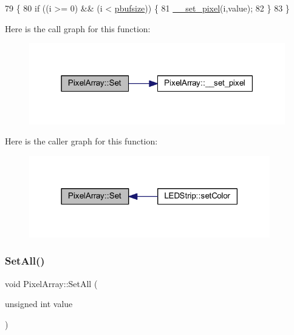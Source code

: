 \begin{DoxyCode}
79 \{
80     \textcolor{keywordflow}{if} ((i >= 0) && (i < \hyperlink{class_pixel_array_aca29e70f9b643bff3733ab2e694439a1}{pbufsize})) \{
81         \hyperlink{class_pixel_array_a4b1a6582bc3bab1f67aebd1f97a5595d}{\_\_set\_pixel}(i,value);
82     \}
83 \}
\end{DoxyCode}
Here is the call graph for this function\+:\nopagebreak
\begin{figure}[H]
\begin{center}
\leavevmode
\includegraphics[width=316pt]{class_pixel_array_afcfe32b74beeced27f928f42131d77c1_cgraph}
\end{center}
\end{figure}
Here is the caller graph for this function\+:\nopagebreak
\begin{figure}[H]
\begin{center}
\leavevmode
\includegraphics[width=297pt]{class_pixel_array_afcfe32b74beeced27f928f42131d77c1_icgraph}
\end{center}
\end{figure}
\mbox{\label{class_pixel_array_a5f560dcef3d1582614858969b20da89d}} 
\subsubsection{\texorpdfstring{Set\+All()}{SetAll()}}
{\footnotesize\ttfamily void Pixel\+Array\+::\+Set\+All (\begin{DoxyParamCaption}\item[{unsigned int}]{value }\end{DoxyParamCaption})}




